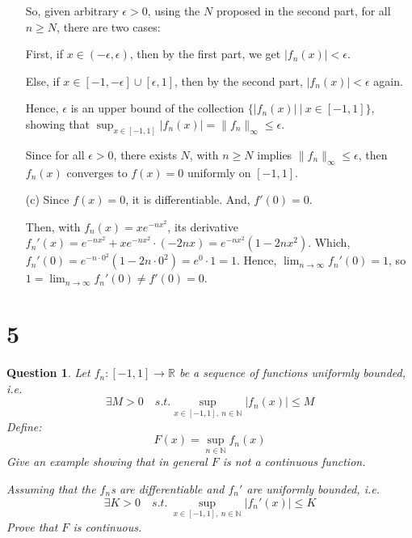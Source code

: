 \documentclass{article}
\newtheorem{question}{Question}
\begin{document}
\begin{itemize}
    \hfill

    So, given arbitrary $\epsilon>0$, using the $N$ proposed in the second part, for all $n\geq N$, there are two cases:

    First, if $x\in (-\epsilon,\epsilon)$, then by the first part, we get $|f_n(x)|<\epsilon$.

    Else, if $x\in [-1,-\epsilon]\cup[\epsilon,1]$, then by the second part, $|f_n(x)|<\epsilon$ again.

    Hence, $\epsilon$ is an upper bound of the collection $\{|f_n(x)|\ |\ x\in [-1,1]\}$, showing that $\sup_{x\in[-1,1]}|f_n(x)|=\|f_n\|_\infty\leq\epsilon$.

    Since for all $\epsilon>0$, there exists $N$, with $n\geq N$ implies $\|f_n\|_\infty\leq\epsilon$, then $f_n(x)$ converges to $f(x)=0$ uniformly on $[-1,1]$.
    
    \hfill

    \item[(c)] Since $f(x)=0$, it is differentiable. And, $f'(0)=0$.
    
    Then, with $f_n(x)=xe^{-nx^2}$, its derivative $f_n'(x)=e^{-nx^2}+xe^{-nx^2}\cdot(-2nx) = e^{-nx^2}(1-2nx^2)$.
    Which, $f_n'(0) = e^{-n\cdot 0^2}(1-2n\cdot 0^2) = e^0\cdot 1 = 1$. Hence, $\lim_{n\rightarrow\infty}f_n'(0)=1$, 
    so $1 = \lim_{n\rightarrow\infty}f_n'(0) \neq f'(0) = 0$.
\end{itemize}

\hfill

\hfill

\section*{5}
\begin{myBox}[]{}
    \begin{question}
        Let $f_n:[-1,1]\rightarrow\mathbb{R}$ be a sequence of functions uniformly bounded, i.e.
        $$\exists M>0\quad s.t. \sup_{x\in [-1,1],\ n\in\mathbb{N}}|f_n(x)| \leq M$$
        Define:
        $$F(x)=\sup_{n\in\mathbb{N}}f_n(x)$$
        Give an example showing that in general $F$ is not a continuous function. 
        
        Assuming that the $f_n$s are differentiable and $f_n'$ are uniformly bounded, i.e.
        $$\exists K>0\quad s.t.\ \sup_{x\in[-1,1],\ n\in\mathbb{N}}|f_n'(x)|\leq K$$
        Prove that $F$ is continuous.
    \end{question}
\end{myBox}
\end{document}
